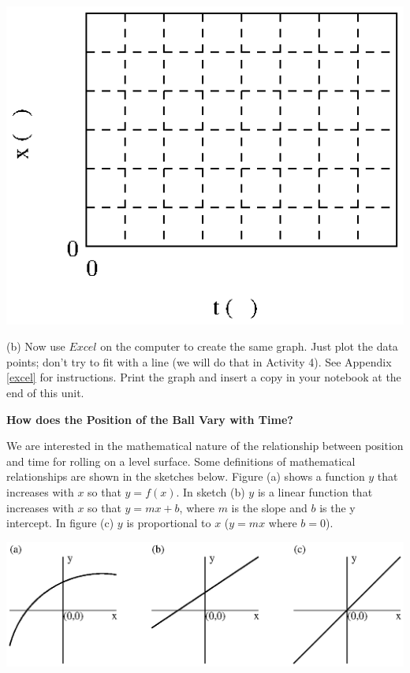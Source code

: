 \vspace{0.3cm}
{\par\centering \includegraphics{measuring/measuring_fig1.eps} \par}
\answerspace{0.6cm}

(b) Now use $Excel$ on the computer to create the same graph. Just plot the 
data points; don't try to fit with a line (we will do that in Activity 4). 
See Appendix \ref{excel} for instructions. Print the graph and insert a copy in your 
notebook at the end of this unit.

\textbf{How does the Position of the Ball Vary with Time?} 

We are interested in the mathematical nature of the relationship between position
and time for rolling on a level surface. Some definitions of mathematical relationships
are shown in the sketches below. Figure (a) shows a function $y$ that increases
with $x$ so that $y = f(x)$. 
In sketch (b) $y$ is a linear function that increases
with $x$ so that $y = mx + b$, where 
$m$ is the slope and $b$ is the y intercept. In
figure (c) $y$ is proportional to $x$ ($y = mx$ where $b = 0$).

\answerspace{0.3cm}
{\par\centering \includegraphics{measuring/measuring_fig2.eps} \par}
\answerspace{0.8cm}

